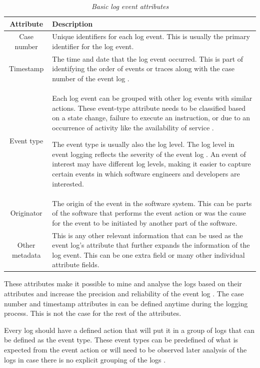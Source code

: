 \begin{table}[!htb]
	\centering
	\caption[Basic log event attributes]
	{\textit{Basic log event attributes \cite{Bekeneva2020}}}
	\label{tbl:ch1_logBasicAttributes}
	\begin{tabularx}{\textwidth}{|c|X|}
		\hline \textbf{Attribute} & \textbf{Description} \\
		\hline Case number & Unique identifiers for each log event. This is usually the primary identifier for the log event. \\
		\hline Timestamp & The time and date that the log event occurred. This is part of identifying the order of events or traces along with the case number of the event log \cite{Kherbouche2017}. \\
		\hline Event type & Each log event can be grouped with other log events with similar actions. These event-type attribute needs to be classified based on a state change, failure to execute an instruction, or due to an occurrence of activity like the availability of service \cite{Fedaghi2010}. \par The event type is usually also the log level. The log level in event logging reflects the severity of the event log \cite{Rong2020}. An event of interest may have different log levels, making it easier to capture certain events in which software engineers and developers are interested.\\
		\hline Originator & The origin of the event in the software system. This can be parts of the software that performs the event action or was the cause for the event to be initiated by another part of the software. \\
		\hline Other metadata & This is any other relevant information that can be used as the event log's attribute that further expands the information of the log event. This can be one extra field or many other individual attribute fields.\\
		\hline
	\end{tabularx}
\end{table}

These attributes make it possible to mine and analyse the logs based on their attributes and increase the precision and reliability of the event log \cite{Kherbouche2017}. The case number and timestamp attributes in  can be defined anytime during the logging process. This is not the case for the rest of the attributes.\par Every log should have a defined action that will put it in a group of logs that can be defined as the event type. These event types can be predefined of what is expected from the event action or will need to be observed later analysis of the logs in case there is no explicit grouping of the logs \cite{Bekeneva2020, Fedaghi2010}.

